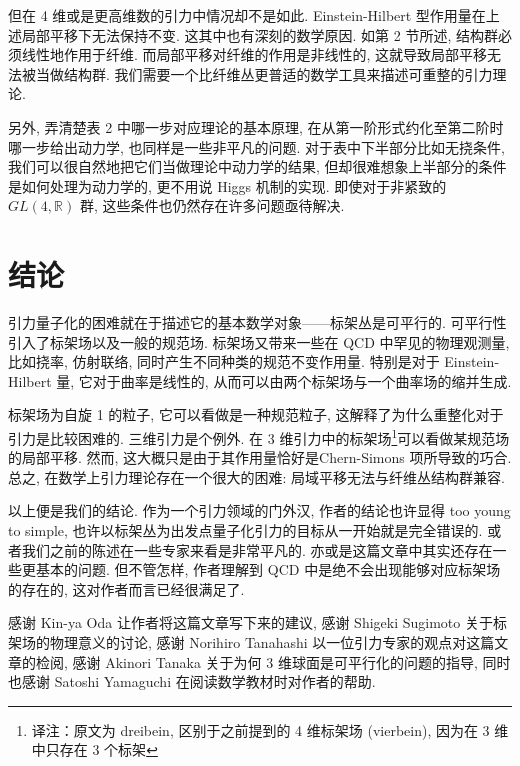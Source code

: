 \documentclass{article}
\begin{document}
但在 4 维或是更高维数的引力中情况却不是如此. Einstein-Hilbert 型作用量在上述局部平移下无法保持不变. 这其中也有深刻的数学原因. 如第 2 节所述, 结构群必须线性地作用于纤维. 而局部平移对纤维的作用是非线性的, 这就导致局部平移无法被当做结构群. 我们需要一个比纤维丛更普适的数学工具来描述可重整的引力理论.

另外, 弄清楚表 2 中哪一步对应理论的基本原理, 在从第一阶形式约化至第二阶时哪一步给出动力学, 也同样是一些非平凡的问题. 对于表中下半部分比如无挠条件, 我们可以很自然地把它们当做理论中动力学的结果, 但却很难想象上半部分的条件是如何处理为动力学的, 更不用说 Higgs 机制的实现. 即使对于非紧致的 $GL(4,\mathbb{R})$ 群, 这些条件也仍然存在许多问题亟待解决.
\section{结论}
引力量子化的困难就在于描述它的基本数学对象——标架丛是可平行的. 可平行性引入了标架场以及一般的规范场. 标架场又带来一些在 QCD 中罕见的物理观测量, 比如挠率, 仿射联络, 同时产生不同种类的规范不变作用量. 特别是对于 Einstein-Hilbert 量, 它对于曲率是线性的, 从而可以由两个标架场与一个曲率场的缩并生成.

标架场为自旋 1 的粒子, 它可以看做是一种规范粒子, 这解释了为什么重整化对于引力是比较困难的. 三维引力是个例外. 在 3 维引力中的标架场\footnote{译注：原文为 dreibein, 区别于之前提到的 4 维标架场 (vierbein), 因为在 3 维中只存在 3 个标架}可以看做某规范场的局部平移. 然而, 这大概只是由于其作用量恰好是Chern-Simons 项所导致的巧合. 总之, 在数学上引力理论存在一个很大的困难: 局域平移无法与纤维丛结构群兼容.

以上便是我们的结论. 作为一个引力领域的门外汉, 作者的结论也许显得 too young to simple, 也许以标架丛为出发点量子化引力的目标从一开始就是完全错误的. 或者我们之前的陈述在一些专家来看是非常平凡的. 亦或是这篇文章中其实还存在一些更基本的问题. 但不管怎样, 作者理解到 QCD 中是绝不会出现能够对应标架场的存在的, 这对作者而言已经很满足了.

感谢 Kin-ya Oda 让作者将这篇文章写下来的建议, 感谢 Shigeki Sugimoto 关于标架场的物理意义的讨论, 感谢 Norihiro Tanahashi 以一位引力专家的观点对这篇文章的检阅, 感谢 Akinori Tanaka 关于为何 3 维球面是可平行化的问题的指导, 同时也感谢 Satoshi Yamaguchi 在阅读数学教材时对作者的帮助.
\end{document}
